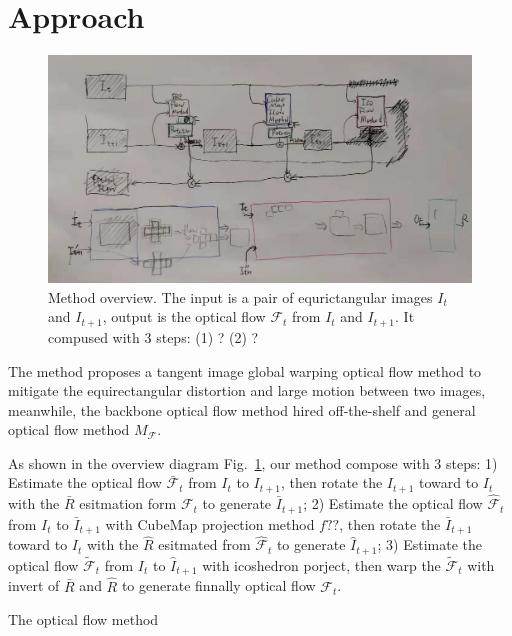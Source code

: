 \section{Approach}\label{sec:approach}

\begin{figure}[hbt!]
	\centering
	\includegraphics[width=0.95\linewidth]{images/method_pipeline_1.jpg}
	\caption{Method overview. The input is a pair of equrictangular images $I_t$ and $I_{t+1}$, output is the optical flow $\mathcal{F}_t$ from  $I_t$ and $I_{t+1}$. It compused with 3 steps: (1) ? (2) ?}
	\label{fig:approach:pipeline}
\end{figure}

The method proposes a tangent image global warping optical flow method to mitigate the equirectangular distortion and large motion between two images, meanwhile, the backbone optical flow method hired off-the-shelf and general optical flow method $M_{\mathcal{F}}$.

As shown in the overview diagram Fig.~\ref{fig:approach:pipeline}, our method compose with 3 steps:
1) Estimate the optical flow $\bar{\mathcal{F}}_t$ from $I_{t}$ to ${I_{t+1}}$, then rotate the $I_{t+1}$ toward to $I_{t}$ with the $\bar{R}$ esitmation form $\mathcal{F}_t$ to generate ${\bar{I}}_{t+1}$;
2) Estimate the optical flow ${\hat{\mathcal{F}}}_t$ from $I_{t}$ to ${\bar{I}}_{t+1}$ with CubeMap projection method $f??$, then rotate the  ${\bar{I}}_{t+1}$ toward to $I_t$ with the $\hat{R}$ esitmated from ${\hat{\mathcal{F}}}_t$ to generate ${\hat{I}}_{t+1}$;
3) Estimate the optical flow $\tilde{\mathcal{F}}_t$ from $I_{t}$ to ${\hat{I}}_{t+1}$ with icoshedron porject, then warp  the $\tilde{\mathcal{F}}_t$ with invert of $\bar{R}$ and $\hat{R}$ to generate finnally optical flow $\mathcal{F}_t$.




The optical flow method 

